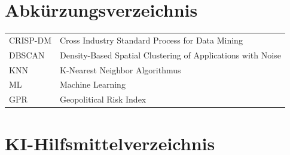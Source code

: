 \documentclass[12pt,a4paper]{article}
\begin{document}
\listoffigures
\newpage

\listoftables
\newpage

\lstlistoflistings
\newpage

\section*{Abkürzungsverzeichnis}
\begin{tabular}{@{}ll}
CRISP-DM & Cross Industry Standard Process for Data Mining \\
DBSCAN & Density-Based Spatial Clustering of Applications with Noise \\
KNN & K-Nearest Neighbor Algorithmus \\
ML & Machine Learning \\
GPR & Geopolitical Risk Index \\
\end{tabular}
\newpage
\newpage
\printbibliography[heading=bibintoc, title={Literaturverzeichnis}]
\newpage
\section*{KI-Hilfsmittelverzeichnis}
\end{document}
